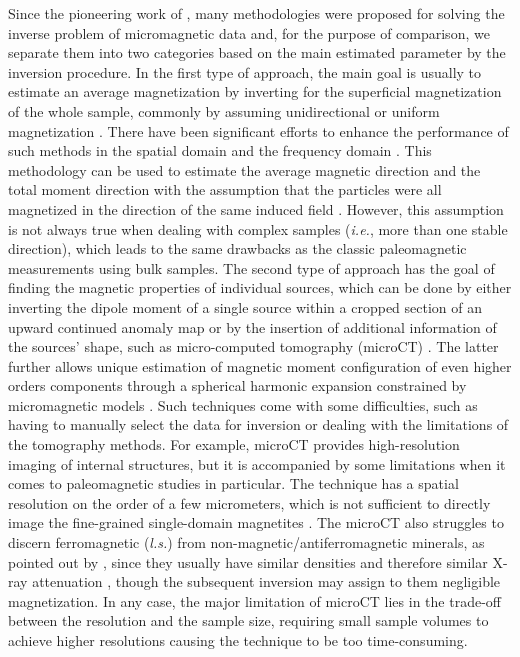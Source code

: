 Since the pioneering work of \cite{Egli2000}, many methodologies were proposed for solving the inverse problem of micromagnetic data and, for the purpose of comparison, we separate them into two categories based on the main estimated parameter by the inversion procedure.
In the first type of approach, the main goal is usually to estimate an average magnetization by inverting for the superficial magnetization of the whole sample, commonly by assuming unidirectional or uniform magnetization \citep[\textit{e.g.},][]{Weiss2007}.
There have been significant efforts to enhance the performance of such methods in the spatial domain \citep[\textit{e.g.},][]{Myre2019} and the frequency domain  \citep[\textit{e.g.},][]{Lima2013}.
This methodology can be used to estimate the average magnetic direction and the total moment direction with the assumption that the particles were all magnetized in the direction of the same induced field \citep[sIRM and/or NRM in basalts,][]{Weiss2007}.
However, this assumption is not always true when dealing with complex samples (\textit{i.e.}, more than one stable direction), which leads to the same drawbacks as the classic paleomagnetic measurements using bulk samples.
The second type of approach has the goal of finding the magnetic properties of individual sources, which can be done by either inverting the dipole moment of a single source within a cropped section of an upward continued anomaly map \citep[\textit{e.g.},][]{Lima2016, Fu2020} or by the insertion of additional information of the sources’ shape, such as micro-computed tomography (microCT) \citep[\textit{e.g.},][]{Fabian2019, DeGroot2018, DeGroot2021, Koster2023}.
The latter further allows unique estimation of magnetic moment configuration of even higher orders components through a spherical harmonic expansion constrained by micromagnetic models \citep[\textit{e.g.},][]{CortesOrtuno2021, CortesOrtuno2022}.
Such techniques come with some difficulties, such as having to manually select the data for inversion or dealing with the limitations of the tomography methods.
For example, microCT provides high-resolution imaging of internal structures, but it is accompanied by some limitations when it comes to paleomagnetic studies in particular. The technique has a spatial resolution on the order of a few micrometers, which is not sufficient to directly image the fine-grained single-domain magnetites \citep{DeGroot2018}.
The microCT also struggles to discern ferromagnetic (\textit{l.s.}) from non-magnetic/antiferromagnetic minerals, as pointed out by \cite{DeGroot2021}, since they usually have similar densities and therefore similar X-ray attenuation \citep{Cnudde2013},  though the subsequent inversion may assign to them negligible magnetization.
In any case, the major limitation of microCT lies in the trade-off between the resolution and the sample size, requiring small sample volumes to achieve higher resolutions causing the technique to be too time-consuming.

